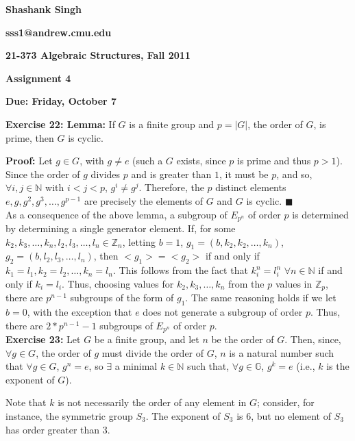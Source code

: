 \documentclass{article}%
\begin{document}
\begin{center}
\textbf{Shashank Singh}

\textbf{sss1@andrew.cmu.edu}

\textbf{21-373 \quad Algebraic Structures, Fall 2011}

\textbf{Assignment 4}

\textbf{Due: Friday, October 7}\\
\end{center}

\textbf{Exercise 22: Lemma:} If $G$ is a finite group and $p = |G|$, the
order of $G$, is prime, then $G$ is cyclic.

\textbf{Proof:} Let $g \in G$, with $g \neq e$ (such a $G$ exists, since $p$
is prime and thus $p > 1$). Since the order of $g$ divides $p$ and is greater
than $1$, it must be $p$, and so, $\forall i,j \in \mathbb{N}$ with $
i < j < p$, $g^i \neq g^j$. Therefore, the $p$ distinct elements $e, g, g^2,
g^3, \ldots, g^{p - 1}$ are precisely the elements of $G$ and $G$ is cyclic.
\qquad $\blacksquare$ \\

As a consequence of the above lemma, a subgroup of $E_{p^n}$ of order $p$ is
determined by determining a single generator element.
If, for some $k_2,k_3,\ldots,k_n,l_2,l_3,\ldots,l_n \in \mathbb{Z}_n$, letting
$b = 1$, $g_1 = (b,k_2,k_2,\ldots,k_n)$, $g_2 = (b,l_2,l_3,\ldots,l_n)$, then
$<g_1> = <g_2>$ if and only if $k_1 = l_1,k_2 = l_2, \ldots, k_n = l_n$. This
follows from the fact that $k_i^n = l_i^n$ $\forall n \in \mathbb{N}$ if
and only if $k_i = l_i$.
Thus, choosing values for $k_2,k_3,\ldots,k_n$ from the $p$ values in
$\mathbb{Z}_p$, there are $p^{n - 1}$ subgroups of the form of $g_1$.
The same reasoning holds if we let $b = 0$, with the exception that $e$ does
not generate a subgroup of order $p$. Thus, there are $2*p^{n - 1} - 1$
subgroups of $E_{p^n}$ of order $p$. \\

\textbf{Exercise 23:} Let $G$ be a finite group, and let $n$ be the order of
$G$. Then, since, $\forall g \in G$, the order of $g$ must divide the order of
$G$, $n$ is a natural number such that $\forall g \in G$, $g^n = e$, so
$\exists$ a minimal $k \in \mathbb{N}$ such that, $\forall g \in \mathbb{G}$,
$g^k = e$ (i.e., $k$ is the exponent of $G$).

Note that $k$ is not necessarily the order of any element in $G$; consider,
for instance, the symmetric group $S_3$. The exponent of $S_3$ is $6$, but no
element of $S_3$ has order greater than $3$.
\end{document}
